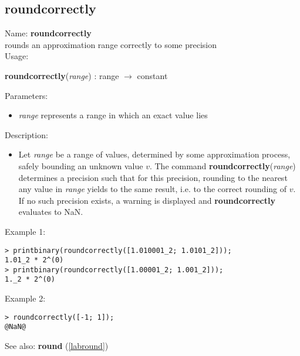 \subsection{roundcorrectly}
\label{labroundcorrectly}
\noindent Name: \textbf{roundcorrectly}\\
rounds an approximation range correctly to some precision\\

\noindent Usage: 
\begin{center}
\textbf{roundcorrectly}(\emph{range}) : \textsf{range} $\rightarrow$ \textsf{constant}\\
\end{center}
Parameters: 
\begin{itemize}
\item \emph{range} represents a range in which an exact value lies
\end{itemize}
\noindent Description: \begin{itemize}

\item Let \emph{range} be a range of values, determined by some approximation
   process, safely bounding an unknown value $v$. The command
   \textbf{roundcorrectly}(\emph{range}) determines a precision such that for this precision,
   rounding to the nearest any value in \emph{range} yields to the same
   result, i.e. to the correct rounding of $v$.
   If no such precision exists, a warning is displayed and \textbf{roundcorrectly}
   evaluates to NaN.
\end{itemize}
\noindent Example 1: 
\begin{center}\begin{minipage}{15cm}\begin{Verbatim}[frame=single]
> printbinary(roundcorrectly([1.010001_2; 1.0101_2]));
1.01_2 * 2^(0)
> printbinary(roundcorrectly([1.00001_2; 1.001_2]));
1._2 * 2^(0)
\end{Verbatim}
\end{minipage}\end{center}
\noindent Example 2: 
\begin{center}\begin{minipage}{15cm}\begin{Verbatim}[frame=single]
> roundcorrectly([-1; 1]);
@NaN@
\end{Verbatim}
\end{minipage}\end{center}
See also: \textbf{round} (\ref{labround})
